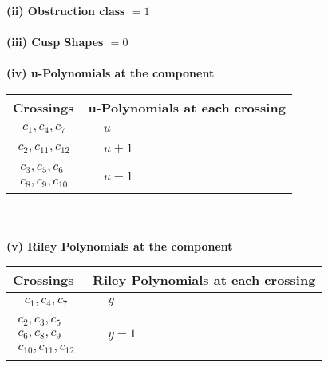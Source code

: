 \documentclass[1p]{elsarticle_modified}
\theoremstyle{definition}
\begin{document}
\flushleft \textbf{(ii) Obstruction class $= 1$}\\~\\
\flushleft \textbf{(iii) Cusp Shapes $= 0$}\\~\\
\newpage\renewcommand{\arraystretch}{1}
\flushleft \textbf{(iv) u-Polynomials at the component}\newline \\
\begin{tabular}{m{50pt}|m{274pt}}
Crossings & \hspace{64pt}u-Polynomials at each crossing \\
\hline $$\begin{aligned}c_{1},c_{4},c_{7}\end{aligned}$$&$\begin{aligned}
&u
\end{aligned}$\\
\hline $$\begin{aligned}c_{2},c_{11},c_{12}\end{aligned}$$&$\begin{aligned}
&u+1
\end{aligned}$\\
\hline $$\begin{aligned}c_{3},c_{5},c_{6}\\c_{8},c_{9},c_{10}\end{aligned}$$&$\begin{aligned}
&u-1
\end{aligned}$\\
\hline
\end{tabular}\\~\\
\newpage\renewcommand{\arraystretch}{1}
\flushleft \textbf{(v) Riley Polynomials at the component}\newline \\
\begin{tabular}{m{50pt}|m{274pt}}
Crossings & \hspace{64pt}Riley Polynomials at each crossing \\
\hline $$\begin{aligned}c_{1},c_{4},c_{7}\end{aligned}$$&$\begin{aligned}
&y
\end{aligned}$\\
\hline $$\begin{aligned}c_{2},c_{3},c_{5}\\c_{6},c_{8},c_{9}\\c_{10},c_{11},c_{12}\end{aligned}$$&$\begin{aligned}
&y-1
\end{aligned}$\\
\hline
\end{tabular}\\~\\
\end{document}
